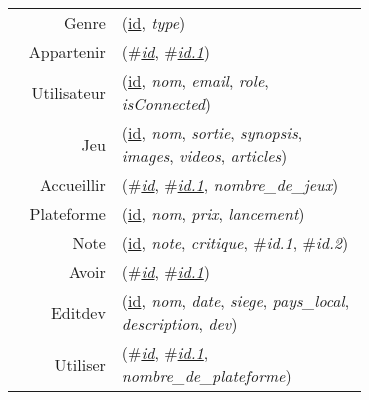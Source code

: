 
\usepackage[normalem]{ulem}
\newenvironment{mld}
  {\par\begin{minipage}{\linewidth}\begin{tabular}{rp{0.7\linewidth}}}
  {\end{tabular}\end{minipage}\par}
\newcommand{\relat}[1]{\textsc{#1}}
\newcommand{\attr}[1]{\emph{#1}}
\newcommand{\prim}[1]{\uline{#1}}
\newcommand{\foreign}[1]{\#\textsl{#1}}


\begin{mld}
  Genre & (\prim{id}, \attr{type})\\
  Appartenir & (\foreign{\prim{id}}, \foreign{\prim{id.1}})\\
  Utilisateur & (\prim{id}, \attr{nom}, \attr{email}, \attr{role}, \attr{isConnected})\\
  Jeu & (\prim{id}, \attr{nom}, \attr{sortie}, \attr{synopsis}, \attr{images}, \attr{videos}, \attr{articles})\\
  Accueillir & (\foreign{\prim{id}}, \foreign{\prim{id.1}}, \attr{nombre\_de\_jeux})\\
  Plateforme & (\prim{id}, \attr{nom}, \attr{prix}, \attr{lancement})\\
  Note & (\prim{id}, \attr{note}, \attr{critique}, \foreign{id.1}, \foreign{id.2})\\
  Avoir & (\foreign{\prim{id}}, \foreign{\prim{id.1}})\\
  Editdev & (\prim{id}, \attr{nom}, \attr{date}, \attr{siege}, \attr{pays\_local}, \attr{description}, \attr{dev})\\
  Utiliser & (\foreign{\prim{id}}, \foreign{\prim{id.1}}, \attr{nombre\_de\_plateforme})\\
\end{mld}